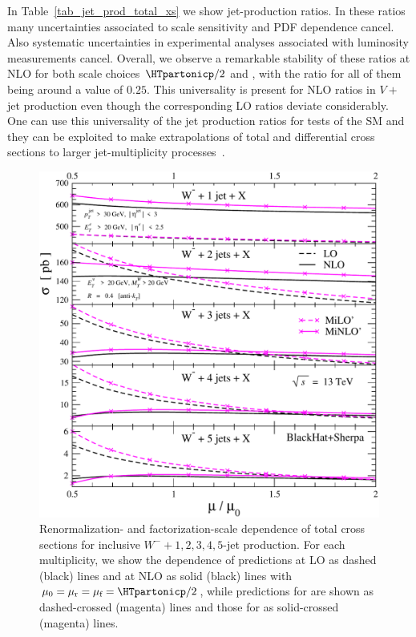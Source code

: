In Table~\ref{tab_jet_prod_total_xs} we show jet-production ratios. In these ratios many uncertainties associated to scale sensitivity and
PDF dependence cancel. Also systematic
uncertainties in experimental analyses associated with luminosity
measurements cancel. Overall, we observe a remarkable stability of these
ratios at NLO for both scale choices $\HTpartonicp/2$ and \MINLOp{},
with the ratio for all of them being around a value of $0.25$. This universality
is present for NLO ratios in $V+$jet production even though the
corresponding LO ratios deviate considerably. One can use this
universality of the jet production ratios for tests of the SM and they
can be exploited to make extrapolations of
total and differential cross sections to larger jet-multiplicity
processes~\cite{BH:Wratios}.


\begin{figure}[t]
\begin{center}
\includegraphics[clip,scale=0.75]{plots/Wmnj-13TeV_dyn_scale_dependence}
\end{center}
\caption{Renormalization- and factorization-scale dependence of total cross
  sections for inclusive $W^-+1,2,3,4,5$-jet production. For each
  multiplicity, we show the dependence of predictions at LO as dashed (black) lines
  and at NLO as solid (black) lines with $\mu_0=\mu_{\textrm r}=\mu_{\textrm f}=\HTpartonicp/2$, while predictions for \MILOp{}
  are shown as dashed-crossed (magenta) lines and those for \MINLOp{} as solid-crossed (magenta) lines.}
\label{fig_Wmjets_sdep}
\end{figure}


